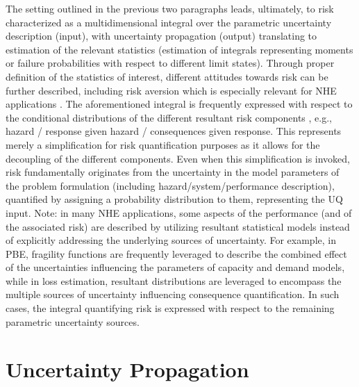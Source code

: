 The setting outlined in the previous two paragraphs leads, ultimately, to risk characterized as a multidimensional integral over the parametric uncertainty description (input), with uncertainty propagation (output) translating to estimation of the relevant statistics (estimation of integrals representing moments or failure probabilities with respect to different limit states). Through proper definition of the statistics of interest, different attitudes towards risk can be further described, including risk aversion which is especially relevant for NHE applications \citep{cha2012riskaverse}. The aforementioned integral is frequently expressed with respect to the conditional distributions of the different resultant risk components \citep{goulet2007evaluation, barbato2013performancebased}, e.g., {hazard / response given hazard / consequences given response}. This represents merely a simplification for risk quantification purposes as it allows for the decoupling of the different components. Even when this simplification is invoked, risk fundamentally originates from the uncertainty in the model parameters of the problem formulation (including hazard/system/performance description), quantified by assigning a probability distribution to them, representing the UQ input. Note: in many NHE applications, some aspects of the performance (and of the associated risk) are described by utilizing resultant statistical models instead of explicitly addressing the underlying sources of uncertainty.  For example, in PBE, fragility functions are frequently leveraged to describe the combined effect of the uncertainties influencing the parameters of capacity and demand models, while in loss estimation, resultant distributions are leveraged to encompass the multiple sources of uncertainty influencing consequence quantification. In such cases, the integral quantifying risk is expressed with respect to the remaining parametric uncertainty sources.

\section{Uncertainty Propagation}
\label{sec:uq_propagation}

